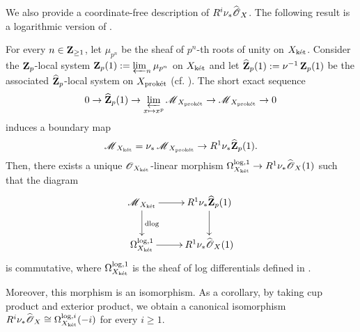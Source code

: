 We also provide a coordinate-free description of $R^i\nu_*\widehat{\operatorname{\mathscr{O}}}_{X}$. The following result is a logarithmic version of \cite[Proposition 3.23, Lemma 3.24]{Scholze-perfectoid-survey}.

\begin{Lemma}\label{Lemma: log analogue of Lemma 3.24 in Scholze's survey paper}
For every $n\in\operatorname{\mathbf{Z}}_{\geq 1}$, let $\mu_{p^n}$ be the sheaf of $p^n$-th roots of unity on $X_{\operatorname{\textrm{k\'{e}t}}}$. Consider the $\operatorname{\mathbf{Z}}_p$-local system $\operatorname{\mathbf{Z}}_p(1):=\varprojlim_{n}\mu_{p^n}$ on $X_{\operatorname{\textrm{k\'{e}t}}}$ and let $\widehat{\operatorname{\mathbf{Z}}}_p(1):=\nu^{-1}\operatorname{\mathbf{Z}}_p(1)$ be the associated $\widehat{\operatorname{\mathbf{Z}}}_p$-local system on $X_{\operatorname{\textrm{prok\'{e}t}}}$ (cf. \cite[Definition 6.3.2]{Diao}). The short exact sequence \[0\rightarrow \widehat{\operatorname{\mathbf{Z}}}_p(1)\rightarrow \varprojlim_{x\mapsto x^p}\operatorname{\mathscr{M}}_{X_{\operatorname{\textrm{prok\'{e}t}}}}\rightarrow \operatorname{\mathscr{M}}_{X_{\operatorname{\textrm{prok\'{e}t}}}}\rightarrow 0\] induces a boundary map \[\operatorname{\mathscr{M}}_{X_{\operatorname{\textrm{k\'{e}t}}}}=\nu_*\operatorname{\mathscr{M}}_{X_{\operatorname{\textrm{prok\'{e}t}}}}\rightarrow R^1\nu_*\widehat{\operatorname{\mathbf{Z}}}_p(1).\] Then, there exists a unique $\operatorname{\mathscr{O}}_{X_{\operatorname{\textrm{k\'{e}t}}}}$-linear morphism $\Omega_{X_{\operatorname{\textrm{k\'{e}t}}}}^{\log, 1}\rightarrow R^1\nu_*\widehat{\operatorname{\mathscr{O}}}_{X}(1)$ such that the diagram 
  \[
        \xymatrix{{\scrM_{X_{\ket}}} \ar^-{}[r] \ar^{\mathrm{dlog}}[d] & {R^1\nu_*\widehat{\Z}_p(1)} \ar^-{}[d] \\
        {\Omega_{X_{\ket}}^{\log, 1}} \ar^-{}[r] & {R^1\nu_*\widehat{\scrO}_{X}(1)} }
    \]
is commutative, where $\Omega_{X_{\operatorname{\textrm{k\'{e}t}}}}^{\log, 1}$  is the sheaf of log differentials defined in \cite[Definition 3.2.25]{Diao}.

Moreover, this morphism is an isomorphism. As a corollary, by taking cup product and exterior product, we obtain a canonical isomorphism $R^i\nu_*\widehat{\operatorname{\mathscr{O}}}_{X}\cong \Omega_{X_{\operatorname{\textrm{k\'{e}t}}}}^{\log,i}(-i)$ for every $i\geq 1$.
\end{Lemma}
